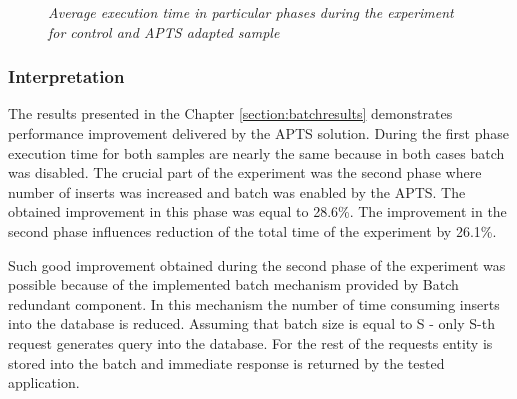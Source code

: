 \documentclass[12pt,a4paper]{article}
\begin{document}
\mydata
\begin{figure}[!htb]
\centering
{}
\caption{\textit{Average execution time in particular phases during the experiment for control and APTS adapted sample}} \label{batchEvalResutlsGraph}
\end{figure}

\subsubsection{Interpretation} 

The results presented in the Chapter \ref{section:batchresults} demonstrates performance improvement delivered by the APTS solution. During the first phase execution time for both samples are nearly the same because in both cases batch was disabled. The crucial part of the experiment was the second phase where number of inserts was increased and batch was enabled by the APTS. The obtained improvement in this phase was equal to 28.6\%. The improvement in the second phase influences reduction of the total time of the experiment by 26.1\%. 

Such good improvement obtained during the second phase of the experiment was possible because of the implemented batch mechanism provided by Batch redundant component. In this mechanism the number of time consuming inserts into the database is reduced. Assuming that batch size is equal to S - only S-th request generates query into the database. For the rest of the requests entity is stored into the batch and immediate response is returned by the tested application. 
\end{document}
